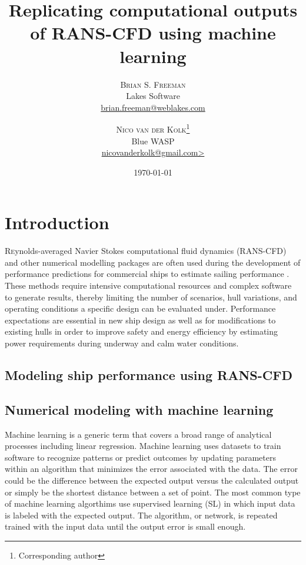 \documentclass[twoside,twocolumn]{article}
\title{Replicating computational outputs of RANS-CFD using machine learning} %
\author{%
\textsc{Brian S. Freeman} \\[1ex] %
\normalsize Lakes Software \\ %
\normalsize \href{mailto:brian.freeman@weblakes.com}{brian.freeman@weblakes.com} %
\and %
\textsc{Nico van der Kolk}\thanks{Corresponding author} \\[1ex] %
\normalsize Blue WASP \\ %
\normalsize \href{mailto:nicovanderkolk@gmail.com> }{nicovanderkolk@gmail.com> } %
}
\date{\today} %
\begin{document}
\maketitle


\section{Introduction}

\lettrine[nindent=0em,lines=3]{R}eynolds-averaged Navier Stokes computational fluid dynamics (RANS-CFD) and other numerical modelling packages are often used during the development of performance predictions for commercial ships to estimate sailing performance \citep{Tezdogan2015}. These methods require intensive computational resources and complex software to generate results, thereby limiting the number of scenarios, hull variations, and operating conditions a specific design can be evaluated under. Performance expectations are essential in new ship design as well as for modifications to existing hulls in order to improve safety and energy efficiency   by estimating power requirements during underway and calm water conditions.

\subsection{Modeling ship performance using RANS-CFD}

\subsection{Numerical modeling with machine learning}

Machine learning is a generic term that covers a broad range of analytical processes including linear regression. Machine learning uses datasets to train software to recognize patterns or predict outcomes by updating parameters within an algorithm that minimizes the error associated with the data. The error could be the difference between the expected output versus the calculated output or simply be the shortest distance between a set of point. The most common type of machine learning algorthims use supervised learning (SL) in which input data is labeled with the expected output. The algorithm, or network, is repeated trained with the input data until the output error is small enough.
\end{document}
